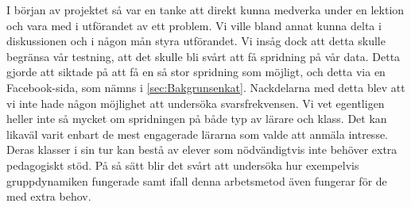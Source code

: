 
\textcolor{Mahogany}{
    I början av projektet så var en tanke att direkt kunna medverka under en lektion och vara med i utförandet av ett problem. Vi ville bland annat kunna delta i diskussionen och i någon mån styra utförandet. Vi insåg dock att detta skulle begränsa vår testning, att det skulle bli svårt att få spridning på vår data. 
    Detta gjorde att siktade på att få en så stor spridning som möjligt, och detta via en Facebook-sida, som nämns i \ref{sec:Bakgrunsenkat}. Nackdelarna med detta blev
    att vi inte hade någon möjlighet att undersöka svarsfrekvensen. Vi vet egentligen heller inte så mycket om spridningen på både typ av lärare och klass. Det kan likaväl varit enbart de mest engagerade lärarna som valde att anmäla intresse. Deras klasser i sin tur kan bestå av elever som nödvändigtvis inte behöver extra pedagogiskt stöd. På så sätt blir det svårt att undersöka hur exempelvis gruppdynamiken fungerade samt ifall denna arbetsmetod även fungerar för de med extra behov.
}